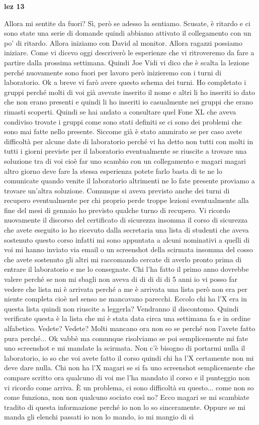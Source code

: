 \textbf{lez 13}

Allora mi sentite da fuori? Sì, però se adesso la sentiamo. Scusate, è ritardo e ci sono state una serie di domande quindi abbiamo attivato il collegamento con un po' di ritardo. Allora iniziamo con David al monitor. Allora ragazzi possiamo iniziare. Come vi dicevo oggi descriverò le esperienze che vi ritroveremo da fare a partire dalla prossima settimana. Quindi Joe Vidi vi dico che è scalta la lezione perché nuovamente sono fuori per lavoro però inizieremo con i turni di laboratorio. Ok a breve vi farò avere questo schema dei turni. Ho completato i gruppi perché molti di voi già avevate inserito il nome e altri li ho inseriti io dato che non erano presenti e quindi li ho inseriti io casualmente nei gruppi che erano rimasti scoperti. Quindi se hai andato a consultare quel Fone XL che aveva condiviso trovate i gruppi come sono stati definiti se ci sono dei problemi che sono mai fatte nello presente. Siccome già è stato ammirato se per caso avete difficoltà per alcune date di laboratorio perché vi ha detto non tutti con molti in tutti i giorni previste per il laboratorio eventualmente se riuscite a trovare una soluzione tra di voi cioè far uno scambio con un collegamento e magari magari altro giorno deve fare la stessa esperienza potete farlo basta di te ne lo comunicate quando venite il laboratorio altrimenti ne lo fate presente proviamo a trovare un'altra soluzione. Comunque si aveva previsto anche dei turni di recupero eventualmente per chi proprio perde troppe lezioni eventualmente alla fine del mesi di gennaio ho previsto qualche turno di recupero. Vi ricordo nuovamente il discorso del certificato di sicurezza insomma il corso di sicurezza che avete eseguito io ho ricevuto dalla secretaria una lista di studenti che aveva sostenuto questo corso infatti mi sono appuntata a alcuni nominativi a quelli di voi mi hanno inviato via email o un screenshot della scirmata insomma del cosso che avete sostenuto gli altri mi raccomando cercate di averlo pronto prima di entrare il laboratorio e me lo consegnate. Chi l'ha fatto il primo anno dovrebbe valere perché se non mi sbagli non aveva di di di di di 5 anni io vi posso far vedere che lista mi è arrivata perché a me è arrivata una lista però non era per niente completa cioè nel senso ne mancavano parecchi. Eccolo chi ha l'X era in questa lista quindi non riuscite a leggerla? Vendranno il discontomo. Quindi verificate questa è la lista che mi è stata data circa una settimana fa e in ordine alfabetico. Vedete? Vedete? Molti mancano ora non so se perché non l'avete fatto pura perché... Ok vabbè ma comunque risolviamo se poi semplicemente mi fate uno screenshot e mi mandate la scirmata. Non c'è bisogno di portarmi nulla il laboratorio, io so che voi avete fatto il corso quindi chi ha l'X certamente non mi deve dare nulla. Chi non ha l'X magari se si fa uno screenshot semplicemente che compare scritto ora qualcuno di voi me l'ha mandato il corso e il punteggio non vi ricordo come arriva. È un problema, ci sono difficoltà su questo... come non so come funziona, non non qualcuno sociato così no? Ecco magari se mi scambiate tradito di questa informazione perché io non lo so sinceramente. Oppure se mi manda gli elenchi passati io non lo mando, io mi mangio di sì 
